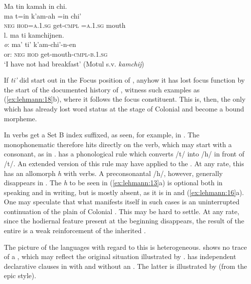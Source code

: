 \documentclass[output=paper]{langsci/langscibook}
\begin{document}
\ex 
Ma  tin        kamah    in        chi.\\
\gll   ma   t=in         k'am-ah   =in       chi'\\
\textsc{neg} \textsc{hod=a.1.sg}  get-\textsc{cmpl}  =\textsc{a.1.sg}   mouth\\

  l.    ma    ti      kamchijnen.\\
\gll   \textit{o}:    ma'     ti’     k'am-chi'-n-en\\
or:  \textsc{neg }    \textsc{hod}    get-mouth-\textsc{cmpl-b.1.sg}\\
\glt ‘I have not had breakfast’ (Motul s.v. \textit{kamchij})
\z
\z 

If \textit{ti’} did start out in the Focus position of , anyhow it has lost focus function by the start of the documented history of  , witness such examples as (\ref{ex:lehmann:18}b), where it follows the focus constituent. This is, then, the only  which has already lost word status at the stage of Colonial  and become a bound morpheme.

In  verbs get a Set B index suffixed, as seen, for example, in . The monophonematic  therefore hits directly on the verb, which may start with a consonant, as in .  has a phonological rule which converts /t/ into /h/ in front of /t/. An extended version of this rule may have applied to the  . At any rate, this  has an allomorph \textit{h} with  verbs. A preconsonantal /h/, however, generally disappears in . The \textit{h} to be seen in (\ref{ex:lehmann:13}a) is optional both in speaking and in writing, but is mostly absent, as it is in  and (\ref{ex:lehmann:16}a). One may speculate that what manifests itself in such cases is an uninterrupted continuation of the plain  of Colonial  . This may be hard to settle. At any rate, since the hodiernal feature present at the beginning disappears, the result of the entire  is a weak reinforcement of the inherited .

The picture of the  languages with regard to this  is heterogeneous.  shows no trace of a  , which may reflect the original situation illustrated by .  has independent declarative clauses in  with and without an . The latter is illustrated by  (from the epic style).\newpage
\end{document}
